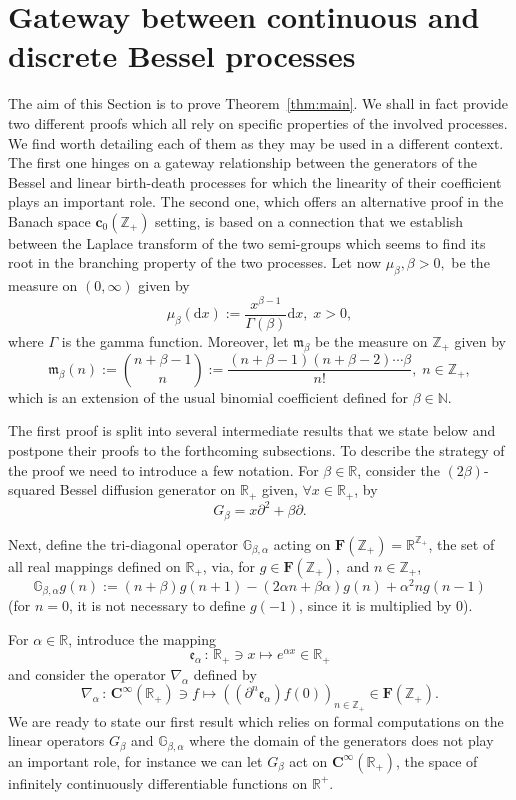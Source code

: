 \documentclass[AHL,Unicode,longabstracts]{cedram}
\newcommand{\df}{\mathrel{:=}}
\newcommand{\cC}{{\mathbf C}}
\newcommand{\NN}{\mathbb{N}}
\newcommand{\RR}{\mathbb{R}}
\newcommand{\ZZ}{\mathbb{Z}}
\newcommand{\fe}{\mathfrak{e}}
\newcommand{\fm}{\mathfrak{m}}
\newcommand{\iy}{\infty}
\newcommand{\lt}{\left}
\newcommand{\na}{\nabla}
\newcommand{\pa}{\partial}
\newcommand{\rt}{\right}
\newcommand{\st}{\,:\,}
\newcommand{\dBg}{{\discret{G}}}
\newcommand{\Bg}{G}
\newcommand{\esF}{\mathbf{F}}
\newcommand{\esc}{\mathbf{c}}
\newcommand*\R{{\mathbb R}}
\newcommand{\discret}[1]{\mathds{#1}}
\let\oldforall\forall
\renewcommand*{\forall}{\mathrel{\oldforall}}
\newcommand*{\dd}{\mathrm{d}}
\newcommand*{\dx}{\dd x}
\begin{document}
\section{Gateway between continuous and discrete Bessel processes}\label{cabadBp}

The aim of this Section is to prove Theorem~\ref{thm:main}. We shall in fact provide two different proofs which all rely on specific properties of the involved processes. We find worth detailing each of them as they may be used in a different context. The first one hinges on a gateway relationship between the generators of the Bessel and linear birth-death processes for which the linearity of their coefficient plays an important role. The second one, which offers an alternative proof in the Banach space $\esc_0(\ZZ_+)$ setting, is based on a connection that we establish between the Laplace transform of the two semi-groups which seems to find its root in the branching property of the two processes. Let now $\mu_{\beta}, \beta>0,$ be the measure on $(0,\iy)$ given by
\[
\mu_{\beta}(\dx)\df \frac{x^{\beta-1}}{\Gamma(\beta)}\dx, \; x>0,
\]
where $\Gamma$ is the gamma function. Moreover, let $\fm_{\beta}$ be the measure on $\ZZ_+$ given by
\begin{equation}\label{mbe}
\fm_{\beta}(n)\df\binom{n+\beta-1}{n}\df \frac{(n+\beta-1)(n+\beta-2)\cdots \beta}{n!}, \; n\in\ZZ_+,
\end{equation}
which is an extension of the usual binomial coefficient defined for $\beta\in\NN$.


The first proof is split into several intermediate results that we state below and postpone their proofs to the forthcoming subsections. To describe the strategy of the proof we need to introduce a few notation. For $\beta\in\RR$, consider the $(2\beta)$-squared Bessel diffusion generator on $\RR_+$ given, $\forall x\in\RR_+$, by
\[
\Bg_{\beta}=x\pa^2+\beta\pa.
\]


Next, define the tri-diagonal operator $\dBg_{\beta,\alpha}$ acting on $\esF(\ZZ_+)=\RR^{\ZZ_+}$, the set of all real mappings defined on $\RR_+$, via, for $ g\in\esF(\ZZ_+),$ and $n\in \ZZ_+$,
\[
\dBg_{\beta,\alpha} g(n)\df (n+\beta)g(n+1)-(2\alpha n+\beta\alpha)g(n)+\alpha^2n g(n-1)
\]
(for $n=0$, it is not necessary to define $g(-1)$, since it is multiplied by 0).

For $\alpha\in\RR$, introduce the mapping
\[
\fe_{\alpha}\st \RR_+\ni x\mapsto e^{\alpha x}\in\RR_+
\]
and consider the operator $\na_{\alpha}$ defined by
\begin{equation}\label{nalph}
\na_{\alpha}\st \cC^\iy(\RR_+)\ni f\mapsto \lt((\pa^n\fe_{\alpha})f(0)\rt)_{n\in\ZZ_+}\in \esF(\ZZ_+).
\end{equation}
We are ready to state our first result which relies on formal computations on the linear operators $\Bg_{\beta}$ and $\dBg_{\beta,\alpha}$ where the domain of the generators does not play an important role, for instance we can let $\Bg_{\beta}$ act on $\cC^\iy(\RR_+)$, the space of infinitely continuously differentiable functions on $\R^+$.
\end{document}
